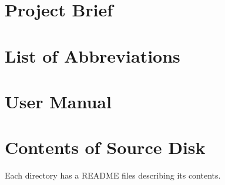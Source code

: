 \section{Project Brief}

\newpage
\mbox{}
\newpage
\mbox{}
\newpage

\section{List of Abbreviations}
\renewcommand{\nomname}{}
\printnomenclature

\clearpage
\section{User Manual}
\label{sec:manual}


\clearpage
\section{Contents of Source Disk}

Each directory has a README files describing its contents.

